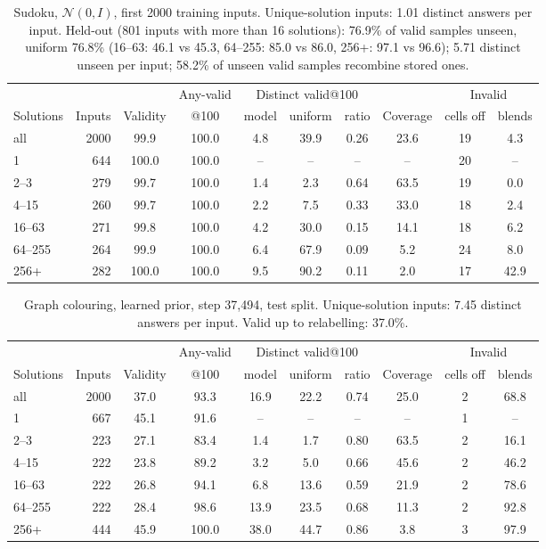 \documentclass[11pt]{article}
\begin{document}
\begin{table}[H]
\centering\small
\begin{tabular}{@{}lrcccccccc@{}}
\toprule
& & & Any-valid & \multicolumn{3}{c}{Distinct valid@100} & & \multicolumn{2}{c}{Invalid} \\
\cmidrule(lr){5-7}\cmidrule(l){9-10}
Solutions & Inputs & Validity & @100 & model & uniform & ratio & Coverage & cells off & blends \\
\midrule
all & 2000 & 99.9 & 100.0 & 4.8 & 39.9 & 0.26 & 23.6 & 19 & 4.3 \\
1 & 644 & 100.0 & 100.0 & -- & -- & -- & -- & 20 & -- \\
2--3 & 279 & 99.7 & 100.0 & 1.4 & 2.3 & 0.64 & 63.5 & 19 & 0.0 \\
4--15 & 260 & 99.7 & 100.0 & 2.2 & 7.5 & 0.33 & 33.0 & 18 & 2.4 \\
16--63 & 271 & 99.8 & 100.0 & 4.2 & 30.0 & 0.15 & 14.1 & 18 & 6.2 \\
64--255 & 264 & 99.9 & 100.0 & 6.4 & 67.9 & 0.09 & 5.2 & 24 & 8.0 \\
256+ & 282 & 100.0 & 100.0 & 9.5 & 90.2 & 0.11 & 2.0 & 17 & 42.9 \\
\bottomrule
\end{tabular}
\caption{Sudoku, $\mathcal{N}(0,I)$, first 2000 training inputs. Unique-solution inputs: 1.01 distinct answers per input. Held-out (801 inputs with more than 16 solutions): 76.9\% of valid samples unseen, uniform 76.8\% (16--63: 46.1 vs 45.3, 64--255: 85.0 vs 86.0, 256+: 97.1 vs 96.6); 5.71 distinct unseen per input; 58.2\% of unseen valid samples recombine stored ones.}
\end{table}

\begin{table}[H]
\centering\small
\begin{tabular}{@{}lrcccccccc@{}}
\toprule
& & & Any-valid & \multicolumn{3}{c}{Distinct valid@100} & & \multicolumn{2}{c}{Invalid} \\
\cmidrule(lr){5-7}\cmidrule(l){9-10}
Solutions & Inputs & Validity & @100 & model & uniform & ratio & Coverage & cells off & blends \\
\midrule
all & 2000 & 37.0 & 93.3 & 16.9 & 22.2 & 0.74 & 25.0 & 2 & 68.8 \\
1 & 667 & 45.1 & 91.6 & -- & -- & -- & -- & 1 & -- \\
2--3 & 223 & 27.1 & 83.4 & 1.4 & 1.7 & 0.80 & 63.5 & 2 & 16.1 \\
4--15 & 222 & 23.8 & 89.2 & 3.2 & 5.0 & 0.66 & 45.6 & 2 & 46.2 \\
16--63 & 222 & 26.8 & 94.1 & 6.8 & 13.6 & 0.59 & 21.9 & 2 & 78.6 \\
64--255 & 222 & 28.4 & 98.6 & 13.9 & 23.5 & 0.68 & 11.3 & 2 & 92.8 \\
256+ & 444 & 45.9 & 100.0 & 38.0 & 44.7 & 0.86 & 3.8 & 3 & 97.9 \\
\bottomrule
\end{tabular}
\caption{Graph colouring, learned prior, step 37{,}494, test split. Unique-solution inputs: 7.45 distinct answers per input. Valid up to relabelling: 37.0\%.}
\end{table}
\end{document}
